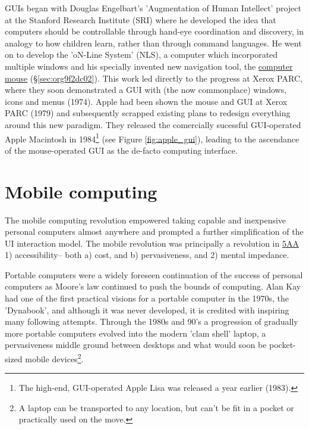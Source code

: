 \documentclass[logo,bsc,singlespacing,parskip]{infthesis}
\begin{document}
GUIs began with Douglas Engelbart's 'Augmentation of Human Intellect' project at the Stanford Research Institute (SRI) where he developed the idea that computers should be controllable through hand-eye coordination and discovery, in analogy to how children learn, rather than through command languages.
He went on to develop the 'oN-Line System' (NLS), a computer which incorporated multiple windows and his specially invented new navigation tool, the \hyperref[sec:org9f2dc02]{computer mouse} (\S \ref{sec:org9f2dc02}).
This work led directly to the progress at Xerox PARC, where they soon demonstrated a GUI with (the now commonplace) windows, icons and menus (1974).
Apple had been shown the mouse and GUI at Xerox PARC (1979) and subsequently scrapped existing plans to redesign everything around this new paradigm.
They released the comercially sucessful GUI-operated Apple Macintosh in 1984\footnote{The high-end, GUI-operated Apple Lisa was released a year earlier (1983).} (see Figure \ref{fig:apple_gui}),  leading to the ascendance of the mouse-operated GUI as the de-facto computing interface.

\section{Mobile computing}
\label{sec:org0d3bcff}
The mobile computing revolution empowered taking capable and inexpensive personal computers almost anywhere and prompted a further simplification of the UI interaction model.
The mobile revolution was principally a revolution in \hyperref[org2644eb5]{5AA} 1) accessibility-- both a) cost, and b) pervasiveness, and 2) mental impedance.

Portable computers were a widely foreseen continuation of the success of personal computers as Moore's law continued to push the bounds of computing.
Alan Kay had one of the first practical visions for a portable computer in the 1970s, the 'Dynabook', and although it was never developed, it is credited with inspiring many following attempts.
Through the 1980s and 90's a progression of gradually more portable computers evolved into the modern 'clam shell' laptop, a pervasiveness middle ground between desktops and what would soon be pocket-sized mobile devices\footnote{A laptop can be transported to any location, but can't be fit in a pocket or practically used on the move.}.
\end{document}
